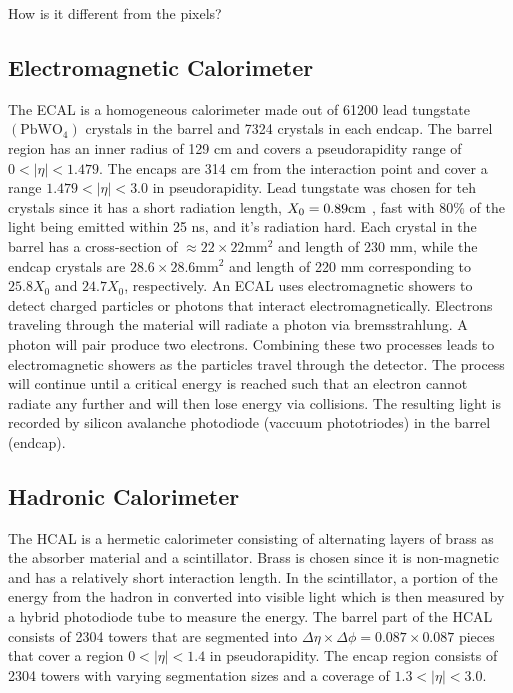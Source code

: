 How is it different from the pixels?

\subsection{Electromagnetic Calorimeter}
\label{sec:ECAL}

The ECAL is a homogeneous calorimeter made out of 61200 lead tungstate $(\text{PbWO}_4)$ crystals in the barrel and 7324 crystals in each endcap. The barrel region has an inner radius of 129 cm and covers a pseudorapidity range of $0<|\eta|<1.479$. The encaps are 314 cm from the interaction point and cover a range $1.479<|\eta|<3.0$ in pseudorapidity. Lead tungstate was chosen for teh crystals since it has a short radiation length, $X_0=0.89\text{cm }$, fast with 80\% of the light being emitted within 25 ns, and it's radiation hard. Each crystal in the barrel has a cross-section of $\approx22\times22 \text{mm}^2$ and length of 230 mm, while the endcap crystals are $28.6\times28.6 \text{mm}^2$ and length of 220 mm corresponding to $25.8X_0$ and $24.7X_0$, respectively. An ECAL uses electromagnetic showers to detect charged particles or photons that interact electromagnetically. Electrons traveling through the material will radiate a photon via bremsstrahlung. A photon will pair produce two electrons. Combining these two processes leads to electromagnetic showers as the particles travel through the detector. The process will continue until a critical energy is reached such that an electron cannot radiate any further and will then lose energy via collisions. The resulting light is recorded by silicon avalanche photodiode (vaccuum phototriodes) in the barrel (endcap). 

\subsection{Hadronic Calorimeter}
\label{sec:HCAL}

The HCAL is a hermetic calorimeter consisting of alternating layers of brass as the absorber material and a scintillator. Brass is chosen since it is non-magnetic and has a relatively short interaction length. In the scintillator, a portion of the energy from the hadron in converted into visible light which is then measured by a hybrid photodiode tube to measure the energy. The barrel part of the HCAL consists of 2304 towers that are segmented into $\Delta\eta\times\Delta\phi=0.087\times0.087$ pieces that cover a region $0<|\eta|<1.4$ in pseudorapidity. The encap region consists of 2304 towers with varying segmentation sizes and a coverage of $1.3<|\eta|<3.0$. 

